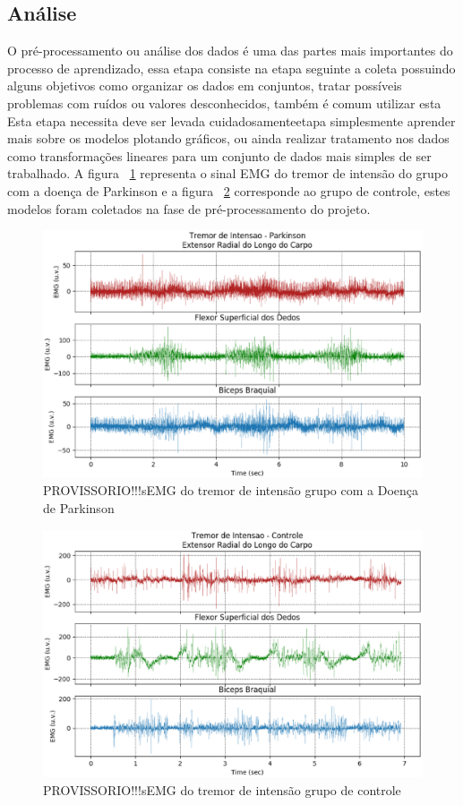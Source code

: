 \subsection{Análise}
O pré-processamento ou análise dos dados é uma das partes mais importantes do processo de aprendizado, essa etapa consiste na etapa seguinte a coleta possuindo alguns objetivos como organizar os dados em conjuntos, tratar possíveis problemas com ruídos ou valores desconhecidos, também é comum utilizar esta Esta etapa necessita deve ser levada cuidadosamenteetapa simplesmente aprender mais sobre os modelos plotando gráficos, ou ainda realizar tratamento nos dados como transformações lineares para um conjunto de dados mais simples de ser trabalhado. \cite{batista2003pre} A figura ~\ref{tremor_i_parkinson} representa o sinal EMG do tremor de intensão do grupo com a doença de Parkinson e  a figura ~\ref{tremor_intensao} corresponde ao grupo de controle, estes modelos foram coletados na fase de pré-processamento do projeto.


\begin{figure}[!htb]
   \centering
    \includegraphics[width=1\textwidth]{figuras/tremor_i_parkinson.eps}
    \caption{PROVISSORIO!!!sEMG do tremor de intensão grupo com a Doença de Parkinson}
    \label{tremor_i_parkinson}
\end{figure}

\begin{figure}[!htb]
   \centering
    \includegraphics[width=1\textwidth]{figuras/tremor_intensao.eps}
    \caption{PROVISSORIO!!!sEMG do tremor de intensão grupo de controle}
    \label{tremor_intensao}
\end{figure}

